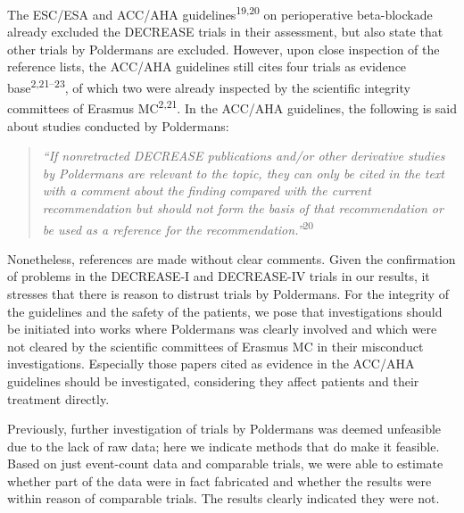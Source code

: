 \documentclass[]{article}
\begin{document}
The ESC/ESA and ACC/AHA guidelines\textsuperscript{19,20} on
perioperative beta-blockade already excluded the DECREASE trials in
their assessment, but also state that other trials by Poldermans are
excluded. However, upon close inspection of the reference lists, the
ACC/AHA guidelines still cites four trials as evidence
base\textsuperscript{2,21--23}, of which two were already inspected by
the scientific integrity committees of Erasmus MC\textsuperscript{2,21}.
In the ACC/AHA guidelines, the following is said about studies conducted
by Poldermans:

\begin{quote}
\emph{``If nonretracted DECREASE publications and/or other derivative
studies by Poldermans are relevant to the topic, they can only be cited
in the text with a comment about the finding compared with the current
recommendation but should not form the basis of that recommendation or
be used as a reference for the recommendation.''}\textsuperscript{20}
\end{quote}

Nonetheless, references are made without clear comments. Given the
confirmation of problems in the DECREASE-I and DECREASE-IV trials in our
results, it stresses that there is reason to distrust trials by
Poldermans. For the integrity of the guidelines and the safety of the
patients, we pose that investigations should be initiated into works
where Poldermans was clearly involved and which were not cleared by the
scientific committees of Erasmus MC in their misconduct investigations.
Especially those papers cited as evidence in the ACC/AHA guidelines
should be investigated, considering they affect patients and their
treatment directly.

Previously, further investigation of trials by Poldermans was deemed
unfeasible due to the lack of raw data; here we indicate methods that do
make it feasible. Based on just event-count data and comparable trials,
we were able to estimate whether part of the data were in fact
fabricated and whether the results were within reason of comparable
trials. The results clearly indicated they were not.
\end{document}
